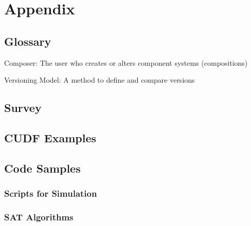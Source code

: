 \chapter{Appendix}

\section{Glossary}
Composer: The user who creates or alters component systems (compositions)

Versioning Model: A method to define and compare versions

\section{Survey}

\section{CUDF Examples}

\section{Code Samples}
\subsection{Scripts for Simulation}
\subsection{SAT Algorithms}